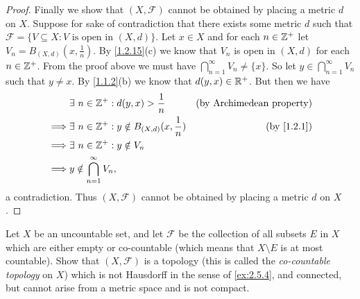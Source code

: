 \begin{proof}
  Finally we show that \((X, \mathcal{F})\) cannot be obtained by placing a metric \(d\) on \(X\).
  Suppose for sake of contradiction that there exists some metric \(d\) such that \(\mathcal{F} = \{V \subseteq X : V \text{ is open in } (X, d)\}\).
  Let \(x \in X\) and for each \(n \in \mathbb{Z}^+\) let \(V_n = B_{(X, d)}(x, \frac{1}{n})\).
  By \cref{1.2.15}(c) we know that \(V_n\) is open in \((X, d)\) for each \(n \in \mathbb{Z}^+\).
  From the proof above we must have \(\bigcap_{n = 1}^\infty V_n \neq \{x\}\).
  So let \(y \in \bigcap_{n = 1}^\infty V_n\) such that \(y \neq x\).
  By \cref{1.1.2}(b) we know that \(d(y, x) \in \mathbb{R}^+\).
  But then we have
  \begin{align*}
             & \exists\ n \in \Z^+ : d(y, x) > \frac{1}{n}               & \text{(by Archimedean property)} \\
    \implies & \exists\ n \in \Z^+ : y \notin B_{(X, d)}(x, \frac{1}{n}) & \text{(by \cref{1.2.1})}         \\
    \implies & \exists\ n \in \Z^+ : y \notin V_n                                                           \\
    \implies & y \notin \bigcap_{n = 1}^\infty V_n,
  \end{align*}
  a contradiction.
  Thus \((X, \mathcal{F})\) cannot be obtained by placing a metric \(d\) on \(X\).
\end{proof}

\begin{ex}\label{ex:2.5.7}
  Let \(X\) be an uncountable set, and let \(\mathcal{F}\) be the collection of all subsets \(E\) in \(X\) which are either empty or co-countable
  (which means that \(X \setminus E\) is at most countable).
  Show that \((X, \mathcal{F})\) is a topology (this is called the \emph{co-countable topology} on \(X\)) which is not Hausdorff in the sense of \cref{ex:2.5.4}, and connected, but cannot arise from a metric space and is not compact.
\end{ex}

